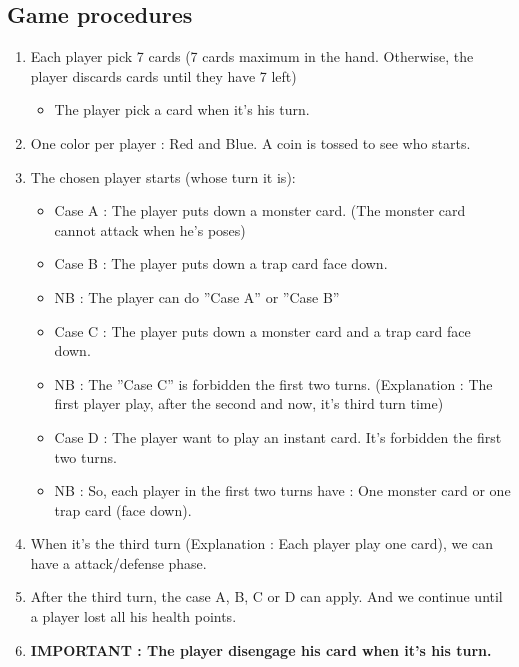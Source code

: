\documentclass[a4paper,12pt]{book}
\begin{document}
\subsection{Game procedures}
\begin{enumerate}
	\item Each player pick 7 cards (7 cards maximum in the hand. Otherwise, the player discards cards until they have 7 left)
	\begin{itemize}
		\item The player pick a card when it's his turn.
	\end{itemize}
		\item One color per player : Red and Blue. A coin is tossed to see who starts.
		\item The chosen player starts (whose turn it is):
	\begin{itemize}
		\item Case A : The player puts down a monster card. (The monster card cannot attack when he's poses)
		\item Case B : The player puts down a trap card face down.
		\item NB : The player can do ''Case A'' or ''Case B''
		\item Case C : The player puts down a monster card and a trap card face down.
		\item NB : The ''Case C'' is forbidden the first two turns. (Explanation : The first player play, after the second and now, it's third turn time)
		\item Case D : The player want to play an instant card. It's forbidden the first two turns.
		\item NB : So, each player in the first two turns have : One monster card or one trap card (face down).
	\end{itemize}
	\item When it's the third turn (Explanation : Each player play one card), we can have a attack/defense phase.
\item After the third turn, the case A, B, C or D can apply. And we continue until a player lost all his health points.
\item \textbf{IMPORTANT : The player disengage his card when it's his turn.}
\end{enumerate}
\end{document}
